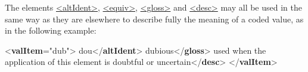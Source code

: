 The elements \hyperref[TEI.altIdent]{<altIdent>}, \hyperref[TEI.equiv]{<equiv>}, \hyperref[TEI.gloss]{<gloss>} and \hyperref[TEI.desc]{<desc>} may all be used in the same way as they are elsewhere to describe fully the meaning of a coded value, as in the following example: \par\bgroup{}\exampleFont \begin{shaded}\noindent\mbox{}{<\textbf{valItem}\hspace*{1em}{ident}="{dub}">}\mbox{}\newline 
{}dou{</\textbf{altIdent}>}\mbox{}\newline 
{}\mbox{}\newline 
{}dubious{</\textbf{gloss}>}\mbox{}\newline 
{}used when the application of this element is doubtful or uncertain{</\textbf{desc}>}\mbox{}\newline 
{</\textbf{valItem}>}\end{shaded}\egroup\par \par
